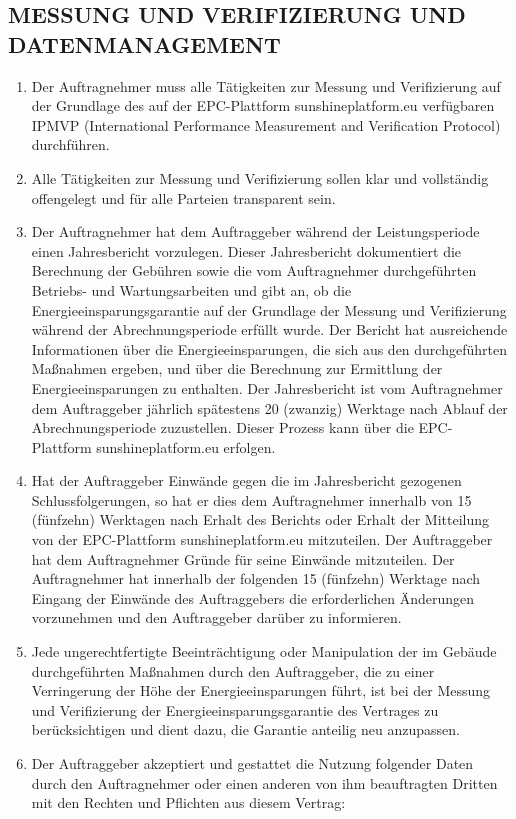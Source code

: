 \begin{multicols}{2}
  \subsection{MESSUNG UND VERIFIZIERUNG UND DATENMANAGEMENT}
  \begin{enumerate}
   \item Der Auftragnehmer muss alle Tätigkeiten zur Messung und Verifizierung auf der Grundlage des auf der EPC-Plattform sunshineplatform.eu verfügbaren IPMVP (International Performance Measurement and Verification Protocol) durchführen.
   \item Alle Tätigkeiten zur Messung und Verifizierung sollen klar und vollständig offengelegt und für alle Parteien transparent sein.
   \item Der Auftragnehmer hat dem Auftraggeber während der Leistungsperiode einen Jahresbericht vorzulegen. Dieser Jahresbericht dokumentiert die Berechnung der Gebühren sowie die vom Auftragnehmer durchgeführten Betriebs- und Wartungsarbeiten und gibt an, ob die Energieeinsparungsgarantie auf der Grundlage der Messung und Verifizierung während der Abrechnungsperiode erfüllt wurde. Der Bericht hat ausreichende Informationen über die Energieeinsparungen, die sich aus den durchgeführten Maßnahmen ergeben, und über die Berechnung zur Ermittlung der Energieeinsparungen zu enthalten. Der Jahresbericht ist vom Auftragnehmer dem Auftraggeber jährlich spätestens 20 (zwanzig) Werktage nach Ablauf der Abrechnungsperiode zuzustellen. Dieser Prozess kann über die EPC-Plattform sunshineplatform.eu erfolgen.
   \item Hat der Auftraggeber Einwände gegen die im Jahresbericht gezogenen Schlussfolgerungen, so hat er dies dem Auftragnehmer innerhalb von 15 (fünfzehn) Werktagen nach Erhalt des Berichts oder Erhalt der Mitteilung von der EPC-Plattform sunshineplatform.eu mitzuteilen. Der Auftraggeber hat dem Auftragnehmer Gründe für seine Einwände mitzuteilen. Der Auftragnehmer hat innerhalb der folgenden 15 (fünfzehn) Werktage nach Eingang der Einwände des Auftraggebers die erforderlichen Änderungen vorzunehmen und den Auftraggeber darüber zu informieren.
   \item Jede ungerechtfertigte Beeinträchtigung oder Manipulation der im Gebäude durchgeführten Maßnahmen durch den Auftraggeber, die zu einer Verringerung der Höhe der Energieeinsparungen führt, ist bei der Messung und Verifizierung der Energieeinsparungsgarantie des Vertrages zu berücksichtigen und dient dazu, die Garantie anteilig neu anzupassen.
   \item Der Auftraggeber akzeptiert und  gestattet die Nutzung folgender Daten durch den Auftragnehmer oder einen anderen von ihm beauftragten Dritten mit den Rechten und Pflichten aus diesem Vertrag:

\end{enumerate}
\end{multicols}

